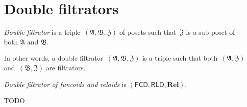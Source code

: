 \chapter{Double filtrators}

\begin{defn}
 \emph{Double filtrator} is a triple~$(\mathfrak{A},\mathfrak{B},\mathfrak{Z})$ of posets such that~$\mathfrak{Z}$ is a sub-poset of both $\mathfrak{A}$ and $\mathfrak{B}$.
\end{defn}

In other words, a double filtrator~$(\mathfrak{A},\mathfrak{B},\mathfrak{Z})$ is a triple such that both~$(\mathfrak{A},\mathfrak{Z})$ and~$(\mathfrak{B},\mathfrak{Z})$ are filtrators.

\begin{defn}
 \emph{Double filtrator of funcoids and reloids} is
 $(\mathsf{FCD},\mathsf{RLD},\mathbf{Rel})$.
\end{defn}


TODO
